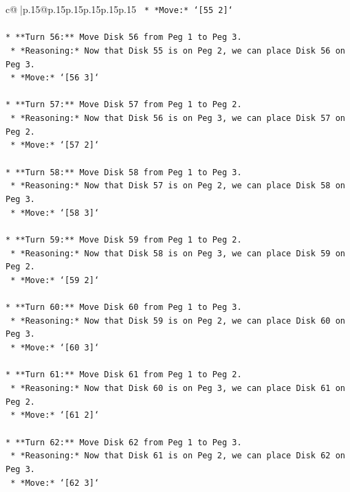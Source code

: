 \documentclass{article}
\begin{document}
{\begin{supertabular}{c@{$\;$}|p{.15\linewidth}@{}p{.15\linewidth}p{.15\linewidth}p{.15\linewidth}p{.15\linewidth}p{.15\linewidth}}
{{{\texttt{    *   *Move:* `{[}55 2{]}`} \\
\\ 
\texttt{*   **Turn 56:** Move Disk 56 from Peg 1 to Peg 3.} \\
\texttt{    *   *Reasoning:* Now that Disk 55 is on Peg 2, we can place Disk 56 on Peg 3.} \\
\texttt{    *   *Move:* `{[}56 3{]}`} \\
\\ 
\texttt{*   **Turn 57:** Move Disk 57 from Peg 1 to Peg 2.} \\
\texttt{    *   *Reasoning:* Now that Disk 56 is on Peg 3, we can place Disk 57 on Peg 2.} \\
\texttt{    *   *Move:* `{[}57 2{]}`} \\
\\ 
\texttt{*   **Turn 58:** Move Disk 58 from Peg 1 to Peg 3.} \\
\texttt{    *   *Reasoning:* Now that Disk 57 is on Peg 2, we can place Disk 58 on Peg 3.} \\
\texttt{    *   *Move:* `{[}58 3{]}`} \\
\\ 
\texttt{*   **Turn 59:** Move Disk 59 from Peg 1 to Peg 2.} \\
\texttt{    *   *Reasoning:* Now that Disk 58 is on Peg 3, we can place Disk 59 on Peg 2.} \\
\texttt{    *   *Move:* `{[}59 2{]}`} \\
\\ 
\texttt{*   **Turn 60:** Move Disk 60 from Peg 1 to Peg 3.} \\
\texttt{    *   *Reasoning:* Now that Disk 59 is on Peg 2, we can place Disk 60 on Peg 3.} \\
\texttt{    *   *Move:* `{[}60 3{]}`} \\
\\ 
\texttt{*   **Turn 61:** Move Disk 61 from Peg 1 to Peg 2.} \\
\texttt{    *   *Reasoning:* Now that Disk 60 is on Peg 3, we can place Disk 61 on Peg 2.} \\
\texttt{    *   *Move:* `{[}61 2{]}`} \\
\\ 
\texttt{*   **Turn 62:** Move Disk 62 from Peg 1 to Peg 3.} \\
\texttt{    *   *Reasoning:* Now that Disk 61 is on Peg 2, we can place Disk 62 on Peg 3.} \\
\texttt{    *   *Move:* `{[}62 3{]}`} \\
}}}
\end{supertabular}}
\end{document}
